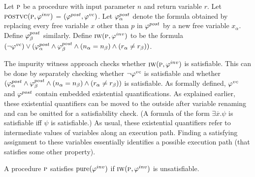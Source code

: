 Let $\textsc{p}$ be a procedure with input parameter $n$ and return variable $r$.
Let $\textsc{postvc}({\textsc{p}},{\varphi^{inv}})$ = $(\varphi^{post},\varphi^{vc})$.
Let $\varphi^{post}_\alpha$ denote the formula obtained by replacing every free variable $x$ other than $p$ in $\varphi^{post}$
by a new free variable $x_\alpha$. Define $\varphi^{post}_\beta$ similarly.
Define $\textsc{iw}(\textsc{p}, \varphi^{inv})$ to be the formula $(\neg \varphi^{vc}) \vee (\varphi^{post}_\alpha \wedge \varphi^{post}_\beta \wedge (n_\alpha = n_\beta) \wedge (r_\alpha \neq r_\beta))$.

The impurity witness approach checks whether $\textsc{iw}(\textsc{p}, \varphi^{inv})$ is satisfiable. This can be done by separately checking
whether $\neg \varphi^{vc}$ is satisfiable and whether $(\varphi^{post}_\alpha \wedge \varphi^{post}_\beta \wedge (n_\alpha = n_\beta) \wedge (r_\alpha \neq r_\beta))$
is satisfiable. As formally defined, $\varphi^{vc}$ and $\varphi^{post}$ contain embedded existential quantifications. As explained earlier,
these existential quantifiers can be moved to the outside after variable renaming and can be omitted for a satisfiability check.
(A formula of the form $\exists \overline{x}. \psi$ is satisfiable iff $\psi$ is satisfiable.)
As usual, these existential quantifiers refer to intermediate values of variables along an execution path.
Finding a satisfying assignment to these variables essentially identifies a possible execution path (that
satisfies some other property).

\begin{theorem}
A procedure $\textsc{p}$ satisfies  $\mathrm{pure}(\varphi^{inv})$ if $\textsc{iw}(\textsc{p}, \varphi^{inv})$ is unsatisfiable.
\end{theorem}

